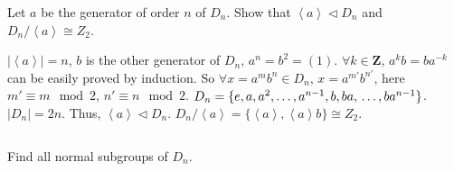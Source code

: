$$ $$

\begin{ex}
    Let $a$ be the generator of order $n$ of $D_{n}$. Show that $\left\langle a\right\rangle\lhd D_{n}$ and $D_{n} /\left\langle a\right\rangle\cong Z_{2}$.
\end{ex}

\begin{answer}
    $\left| \left\langle a\right\rangle \right| =n$, $b$ is the other generator of $D_{n}$, $a^{n}=b^{2}=(1)$. $\forall k\in \mathbf{Z}$, $a^{k}b=ba^{-k}$ can be easily proved by induction. So $\forall x=a^{m}b^{n}\in D_{n}$, $x=a^{m'}b^{n'}$, here $m'\equiv m\mod 2$, $n'\equiv n\mod 2$. $D_{n}=\{e, a, a^{2}, \dots, a^{n-1}, b, ba, \\\dots, ba^{n-1}\}$. $\left| D_{n} \right| =2n$. Thus, $\left\langle a\right\rangle\lhd D_{n}$. $D_{n} /\left\langle a\right\rangle=\{\left\langle a\right\rangle, \left\langle a\right\rangle b\}\cong Z_{2}$.
\end{answer}

$$ $$

\begin{ex}
    Find all normal subgroups of $D_{n}$.
\end{ex}

